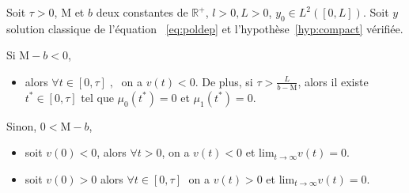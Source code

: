 \documentclass[a4paper]{article}
\newcommand{\mass}{\mathrm{M}}
\newcommand{\dep}{b}
\begin{document}
\begin{proposition}
	\label{prop:v}
	Soit $\tau>0$, $\mass$ et $\dep$ deux constantes de $\mathbb{R}^+$, 
	$l>0, L>0$, $y_0 \in L^2([0,L])$.
	Soit $y$ solution classique de l'équation ~\eqref{eq:poldep} et l'hypothèse~\eqref{hyp:compact} vérifiée.
	
	Si $\mass-\dep < 0 $,
	\begin{itemize}
		\item  alors $\forall t \in [0,\tau] \;, \;$ on a $v(t) <0$. 
		De plus, si $\tau> \displaystyle \frac{L}{\dep-\mass}$, alors il existe $t^* \in [0,\tau]$ tel que $\mu_0(t^*)=0$ et $\mu_1(t^*) = 0$. 
	\end{itemize}
	
	Sinon, $0 < \mass-\dep$,
	\begin{itemize}
	 \item soit $v(0)<0$, alors $\forall t>0 $, on a $v(t)<0$ et $\mathrm{lim}_{t \rightarrow \infty} v(t) = 0$. 
	 \item soit $v(0)>0$ alors $\forall t \in [0,\tau] \;$ on a $v(t) >0$ et $\mathrm{lim}_{t \rightarrow \infty} v(t) = 0$.
	 \end{itemize}
\end{proposition}
\end{document}
